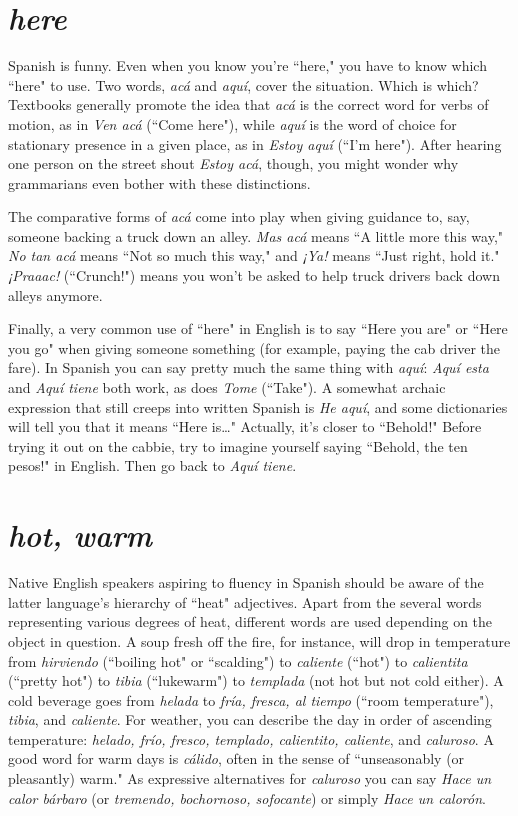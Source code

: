 \section{\emph{here}}

Spanish is funny. Even when you know you're ``here," you
have to know which ``here" to use. Two words, \emph{acá} and \emph{aquí}, cover
the situation. Which is which? Textbooks generally promote the idea
that \emph{acá} is the correct word for verbs of motion, as in \emph{Ven acá} (``Come
here"), while \emph{aquí} is the word of choice for stationary presence in a
given place, as in \emph{Estoy aquí} (``I'm here"). After hearing one person on
the street shout \emph{Estoy acá}, though, you might wonder why grammarians even bother with these distinctions.

The comparative forms of \emph{acá} come into play when giving
guidance to, say, someone backing a truck down an alley. \emph{Mas acá}
means ``A little more this way," \emph{No tan acá} means ``Not so much this
way," and \emph{¡Ya!} means ``Just right, hold it." \emph{¡Praaac!} (``Crunch!") means
you won't be asked to help truck drivers back down alleys anymore.

Finally, a very common use of ``here" in English is to say
``Here you are" or ``Here you go" when giving someone something (for
example, paying the cab driver the fare). In Spanish you can say pretty
much the same thing with \emph{aquí}: \emph{Aquí esta} and \emph{Aquí tiene} both work,
as does \emph{Tome} (``Take"). A somewhat archaic expression that still creeps
into written Spanish is \emph{He aquí}, and some dictionaries will tell you
that it means ``Here is\ldots{}" Actually, it's closer to ``Behold!" Before
trying it out on the cabbie, try to imagine yourself saying ``Behold, the
ten pesos!" in English. Then go back to \emph{Aquí tiene}.

\section{\emph{hot, warm}}

Native English speakers aspiring to fluency in Spanish should
be aware of the latter language's hierarchy of ``heat" adjectives. Apart
from the several words representing various degrees of heat, different
words are used depending on the object in question. A soup fresh off
the fire, for instance, will drop in temperature from \emph{hirviendo} (``boiling
hot" or ``scalding") to \emph{caliente} (``hot") to \emph{calientita} (``pretty hot") to
\emph{tibia} (``lukewarm") to \emph{templada} (not hot but not cold either). A cold
beverage goes from \emph{helada} to \emph{fría, fresca, al tiempo} (``room temperature"), \emph{tibia}, and \emph{caliente}. For weather, you can describe the day in order of ascending temperature: \emph{helado, frío, fresco, templado, calientito, caliente}, and \emph{caluroso}. A good word for warm days is \emph{cálido}, often
in the sense of ``unseasonably (or pleasantly) warm." As expressive alternatives for \emph{caluroso} you can say \emph{Hace un calor bárbaro} (or \emph{tremendo, bochornoso, sofocante}) or simply \emph{Hace un calorón}.


